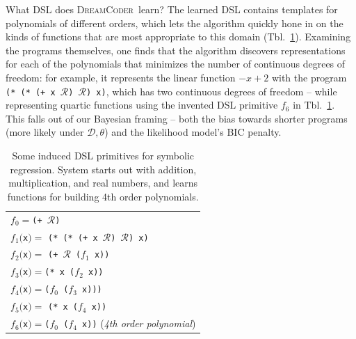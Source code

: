 \documentclass{article}
\newcommand{\system}{\textsc{DreamCoder}~}
\newcommand{\code}[1]{{\footnotesize\texttt{#1}}}
\newcommand{\probability}{\mathds{P}} %
\begin{document}

What DSL does \system learn?
The learned DSL contains templates for polynomials of different orders,
which lets the algorithm quickly hone in on the kinds of functions that are most appropriate to this domain (Tbl.~\ref{regressionDSL}).
Examining the programs themselves,
one finds that the algorithm discovers representations for each of the polynomials that minimizes the number of continuous degrees of freedom:
for example, it represents the linear function $-x+2$ with the program 
\code{(* (* (+ x }$\mathcal{R}$\code{) }$\mathcal{R}$\code{) x)}, which has two continuous degrees of freedom -- while representing quartic functions using the invented DSL primitive $f_6$ in Tbl.~\ref{regressionDSL}.
This falls out of our Bayesian framing -- both the bias towards shorter programs (more likely under $\mathcal{D},\theta$) and the likelihood model's BIC penalty.
\begin{table}\centering
\begin{tabular}{l}
  \toprule
    $f_0 = $\code{(+ }$\mathcal{R}$\code{)}\\
    $f_1($\code{x}$) =$ \code{(* (* (+ x }$\mathcal{R}$\code{) }$\mathcal{R}$\code{) x)} \\
      $f_2($\code{x}$) =$ \code{(+ }$\mathcal{R}$\code{ ($f_1$ x))} \\
      $f_3($\code{x}$) = $\code{(* x (}$f_2$\code{ x))}\\
  $f_4($\code{x}$) = $\code{(}$f_0$\code{ (}$f_3$\code{ x)))}\\
  $f_5($\code{x}$) =$ \code{(* x (}$f_4$\code{ x))}\\
  $f_6($\code{x}$) = $\code{(}$f_0$\code{ (}$f_4$\code{ x))} (\emph{4th order polynomial})
  \\\bottomrule
\end{tabular}
\caption{Some induced DSL primitives for symbolic regression. System starts out with addition, multiplication, and real numbers, and learns functions for building 4th order polynomials.}\label{regressionDSL}
\end{table}
\end{document}
